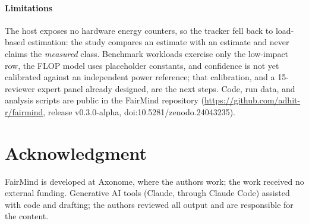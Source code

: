 \documentclass[10pt,conference]{IEEEtran}
\begin{document}
\paragraph{Limitations} The host exposes no hardware energy counters, so the
tracker fell back to load-based estimation: the study compares an estimate with
an estimate and never claims the \emph{measured} class. Benchmark workloads
exercise only the low-impact row, the FLOP model uses placeholder constants,
and confidence is not yet calibrated against an independent power reference;
that calibration, and a 15-reviewer expert panel already designed, are the next
steps. Code, run data, and analysis scripts are public in the FairMind
repository (\url{https://github.com/adhit-r/fairmind}, release v0.3.0-alpha,
doi:10.5281/zenodo.24043235).

\section*{Acknowledgment}
FairMind is developed at Axonome, where the authors work; the work received no
external funding. Generative AI tools (Claude, through Claude Code) assisted
with code and drafting; the authors reviewed all output and are responsible for
the content.
\end{document}

